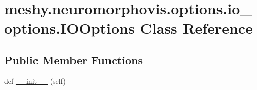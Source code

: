 \hypertarget{classmeshy_1_1neuromorphovis_1_1options_1_1io__options_1_1IOOptions}{}\section{meshy.\+neuromorphovis.\+options.\+io\+\_\+options.\+I\+O\+Options Class Reference}
\label{classmeshy_1_1neuromorphovis_1_1options_1_1io__options_1_1IOOptions}


 


\subsection*{Public Member Functions}
\begin{DoxyCompactItemize}
\item 
def \hyperlink{classmeshy_1_1neuromorphovis_1_1options_1_1io__options_1_1IOOptions_a17fdaded33470dace064ce1f1a7cf8b5}{\+\_\+\+\_\+init\+\_\+\+\_\+} (self)
\end{DoxyCompactItemize}
